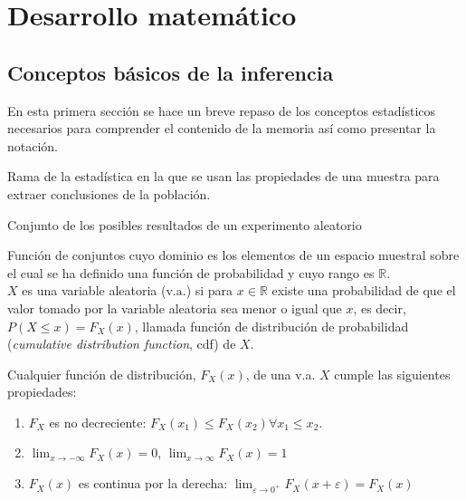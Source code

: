 %
%


\chapter{Desarrollo matemático}

\section{Conceptos básicos de la inferencia}

	En esta primera sección se hace un breve repaso de los conceptos estadísticos necesarios para comprender el contenido de la memoria así como presentar la notación.
	
\begin{definicion}
	Rama de la estadística en la que se usan las propiedades de una muestra para extraer conclusiones de la población. 
\end{definicion}

\begin{definicion} 
	Conjunto de los posibles resultados de un experimento aleatorio
\end{definicion}

\begin{definicion}
	Función de conjuntos cuyo dominio es los elementos de un espacio muestral sobre el cual se ha definido una función de probabilidad y cuyo rango es $\mathbb{R}$.\\
	$X$ es una variable aleatoria (v.a.) si para $x \in \mathbb{R}$ existe una probabilidad de que el valor tomado por la variable aleatoria sea menor o igual que $x$, es decir, $P(X \leq x) = F_X (x)$, llamada función de distribución de probabilidad (\textit{cumulative distribution function}, cdf) de $X$.	
\end{definicion}

Cualquier función de distribución, $F_X(x)$, de una v.a. $X$ cumple las siguientes propiedades: 
\begin{enumerate}
	\item $F_X$ es no decreciente: 
			$F_X(x_1) \leq F_X(x_2) \forall x_1 \leq x_2$.
	\item $\lim_{x \rightarrow -\infty} F_X(x) = 0$,
			$\lim_{x \rightarrow \infty} F_X(x) = 1$
	\item $F_X(x)$ es continua por la derecha: 
		$\lim_{\varepsilon \rightarrow 0^+} F_X(x+\varepsilon) = F_X(x)$
\end{enumerate}

